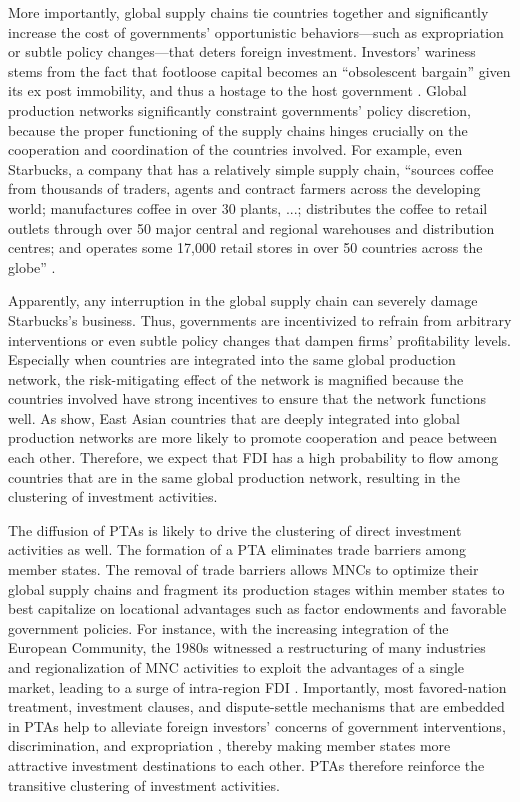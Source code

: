 \documentclass{article}
\begin{document}
More importantly, global supply chains tie countries together and significantly increase the cost of governments' opportunistic behaviors---such as expropriation or subtle policy changes---that deters foreign investment. Investors' wariness stems from the fact that footloose capital becomes an ``obsolescent bargain'' given its ex post immobility, and thus a hostage to the host government \citep{Vernon:1971,Vernon:1980}. Global production networks significantly constraint governments' policy discretion, because the proper functioning of the supply chains hinges crucially on the cooperation and coordination of the countries involved. For example, even Starbucks, a company that has a relatively simple supply chain, ``sources coffee from thousands of traders, agents and contract farmers across the developing world; manufactures coffee in over 30 plants, ...; distributes the coffee to retail outlets through over 50 major central and regional warehouses and distribution centres; and operates some 17,000 retail stores in over 50 countries across the globe'' \citep[142]{UNCTAD:2013}.

Apparently, any interruption in the global supply chain can severely damage Starbucks's business. Thus, governments are incentivized to refrain from arbitrary interventions or even subtle policy changes that dampen firms' profitability levels. Especially when countries are integrated into the same global production network, the risk-mitigating effect of the network is magnified because the countries involved have strong incentives to ensure that the network functions well. As \citet{Kim_Solingen:2017} show, East Asian countries that are deeply integrated into global production networks are more likely to promote cooperation and peace between each other. Therefore, we expect that FDI has a high probability to flow among countries that are in the same global production network, resulting in the clustering of investment activities.

The diffusion of PTAs is likely to drive the clustering of direct investment activities as well. The formation of a PTA eliminates trade barriers among member states. The removal of trade barriers allows MNCs to optimize their global supply chains and fragment its production stages within member states to best capitalize on locational advantages such as factor endowments and favorable government policies. For instance, with the increasing integration of the European Community, the 1980s witnessed a restructuring of many industries and regionalization of MNC activities to exploit the advantages of a single market, leading to a surge of intra-region FDI \citep[34]{UNCTAD:1991}. Importantly, most favored-nation treatment, investment clauses, and dispute-settle mechanisms that are embedded in PTAs help to alleviate foreign investors' concerns of government interventions, discrimination, and expropriation \citep{Buthe_Milner:2008,buthe2014foreign}, thereby making member states more attractive investment destinations to each other. PTAs therefore reinforce the transitive clustering of investment activities.
\end{document}
